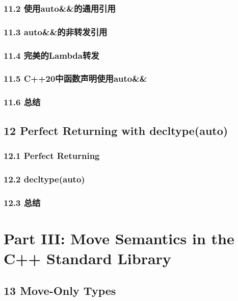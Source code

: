 \documentclass[11pt,a4paper,UTF8]{ctexart}
\begin{document}
		\subsubsection{11.2 使用auto\&\&的通用引用}
		
		\subsubsection{11.3 auto\&\&的非转发引用}
		
		\subsubsection{11.4 完美的Lambda转发}
		
		\subsubsection{11.5 C++20中函数声明使用auto\&\&}
		
		\subsubsection{11.6 总结}
		
	\subsection{12 Perfect Returning with decltype(auto)}
	
		\subsubsection{12.1 Perfect Returning}
		
		\subsubsection{12.2 decltype(auto)}
		
		\subsubsection{12.3 总结}
		
		
	\section{Part III: Move Semantics in the C++ Standard Library}
	\subsection{13 Move-Only Types}
\end{document}
